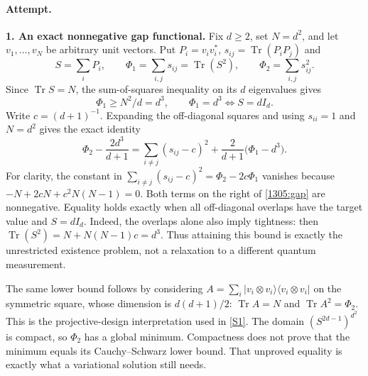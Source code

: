 \documentclass[11pt,a4paper]{article}
\newcommand{\sref}[2]{\hyperlink{source:#1:#2}{[S#2]}}
\numberwithin{equation}{section}
\begin{document}
\paragraph{Attempt.}
\textbf{1. An exact nonnegative gap functional.}
Fix $d\geq2$, set $N=d^2$, and let $v_1,\ldots,v_N$ be arbitrary unit
vectors. Put $P_i=v_iv_i^*$, $s_{ij}=\operatorname{Tr}(P_iP_j)$ and
\[
 S=\sum_iP_i,\qquad
 \Phi_1=\sum_{i,j}s_{ij}=\operatorname{Tr}(S^2),\qquad
 \Phi_2=\sum_{i,j}s_{ij}^2.
\]
Since $\operatorname{Tr}S=N$, the sum-of-squares inequality on its
$d$ eigenvalues gives
\begin{equation}\label{1305:tight}
 \Phi_1\geq N^2/d=d^3,
 \qquad \Phi_1=d^3\Longleftrightarrow S=dI_d.
\end{equation}
Write $c=(d+1)^{-1}$. Expanding the off-diagonal squares and using
$s_{ii}=1$ and $N=d^2$ gives the exact identity
\begin{equation}\label{1305:gap}
 \Phi_2-\frac{2d^3}{d+1}
 =\sum_{i\ne j}(s_{ij}-c)^2
       +\frac2{d+1}\bigl(\Phi_1-d^3\bigr).
\end{equation}
For clarity, the constant in
$\sum_{i\ne j}(s_{ij}-c)^2=\Phi_2-2c\Phi_1$
vanishes because $-N+2cN+c^2N(N-1)=0$.
Both terms on the right of \eqref{1305:gap} are nonnegative.
Equality holds exactly when all off-diagonal overlaps have the target
value and $S=dI_d$. Indeed, the overlaps alone also imply tightness:
then $\operatorname{Tr}(S^2)=N+N(N-1)c=d^3$.
Thus attaining this bound is exactly the unrestricted existence problem,
not a relaxation to a different quantum measurement.

The same lower bound follows by considering
$A=\sum_i|v_i\otimes v_i\rangle\langle v_i\otimes v_i|$ on the
symmetric square, whose dimension is $d(d+1)/2$:
$\operatorname{Tr}A=N$ and $\operatorname{Tr}A^2=\Phi_2$.
This is the projective-design interpretation used in \sref{1305}{1}.
The domain $(S^{2d-1})^{d^2}$ is compact, so $\Phi_2$ has a global
minimum. Compactness does not prove that the minimum equals its
Cauchy--Schwarz lower bound. That unproved equality is exactly what a
variational solution still needs.
\end{document}
